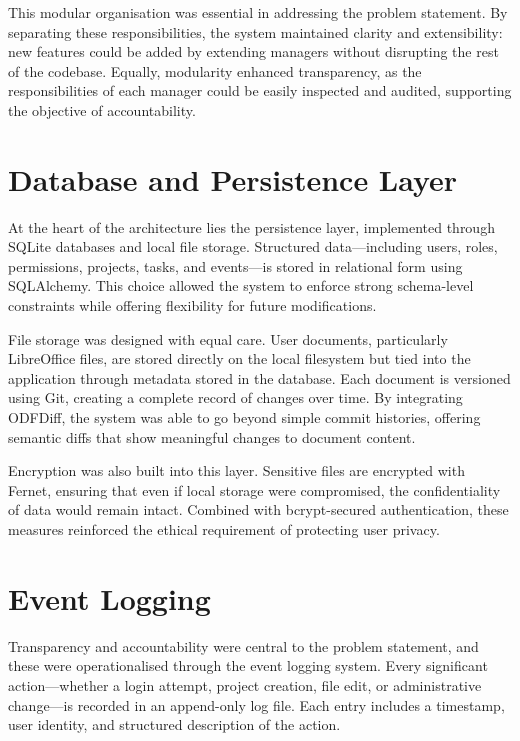 \documentclass{report}
\begin{document}
This modular organisation was essential in addressing the problem statement. By separating these responsibilities, the system maintained clarity and extensibility: new features could be added by extending managers without disrupting the rest of the codebase. Equally, modularity enhanced transparency, as the responsibilities of each manager could be easily inspected and audited, supporting the objective of accountability.

\section{Database and Persistence Layer}

At the heart of the architecture lies the persistence layer, implemented through SQLite databases and local file storage. Structured data—including users, roles, permissions, projects, tasks, and events—is stored in relational form using SQLAlchemy. This choice allowed the system to enforce strong schema-level constraints while offering flexibility for future modifications.

File storage was designed with equal care. User documents, particularly LibreOffice files, are stored directly on the local filesystem but tied into the application through metadata stored in the database. Each document is versioned using Git, creating a complete record of changes over time. By integrating ODFDiff, the system was able to go beyond simple commit histories, offering semantic diffs that show meaningful changes to document content.

Encryption was also built into this layer. Sensitive files are encrypted with Fernet, ensuring that even if local storage were compromised, the confidentiality of data would remain intact. Combined with bcrypt-secured authentication, these measures reinforced the ethical requirement of protecting user privacy.

\section{Event Logging}

Transparency and accountability were central to the problem statement, and these were operationalised through the event logging system. Every significant action—whether a login attempt, project creation, file edit, or administrative change—is recorded in an append-only log file. Each entry includes a timestamp, user identity, and structured description of the action.
\end{document}

